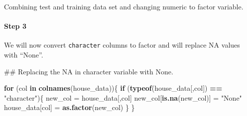 \documentclass[]{article}
\newenvironment{Shaded}{\begin{snugshade}}{\end{snugshade}}
\newcommand{\KeywordTok}[1]{\textcolor[rgb]{0.13,0.29,0.53}{\textbf{#1}}}
\newcommand{\StringTok}[1]{\textcolor[rgb]{0.31,0.60,0.02}{#1}}
\newcommand{\CommentTok}[1]{\textcolor[rgb]{0.56,0.35,0.01}{\textit{#1}}}
\newcommand{\ControlFlowTok}[1]{\textcolor[rgb]{0.13,0.29,0.53}{\textbf{#1}}}
\newcommand{\OperatorTok}[1]{\textcolor[rgb]{0.81,0.36,0.00}{\textbf{#1}}}
\newcommand{\NormalTok}[1]{#1}
\let\oldparagraph\paragraph
\renewcommand{\paragraph}[1]{\oldparagraph{#1}\mbox{}}
\begin{document}
Combining test and training data set and changing numeric to factor
variable.

\begin{Shaded}
\end{Shaded}

\paragraph{Step 3}\label{step-3}

We will now convert \texttt{character} columns to factor and will
replace NA values with ``None''.

\begin{Shaded}
\begin{Highlighting}[]
\NormalTok{## Replacing the NA in character variable with None.}

\ControlFlowTok{for}\NormalTok{ (col }\ControlFlowTok{in} \KeywordTok{colnames}\NormalTok{(house_data))\{}
  \ControlFlowTok{if}\NormalTok{ (}\KeywordTok{typeof}\NormalTok{(house_data[,col]) }\OperatorTok{==}\StringTok{ "character"}\NormalTok{)\{}
\NormalTok{    new_col =}\StringTok{ }\NormalTok{house_data[,col]}
\NormalTok{    new_col[}\KeywordTok{is.na}\NormalTok{(new_col)] =}\StringTok{ "None"}
\NormalTok{    house_data[col] =}\StringTok{ }\KeywordTok{as.factor}\NormalTok{(new_col)}
\NormalTok{  \}}
\NormalTok{\}}
\end{Highlighting}
\end{Shaded}
\end{document}
